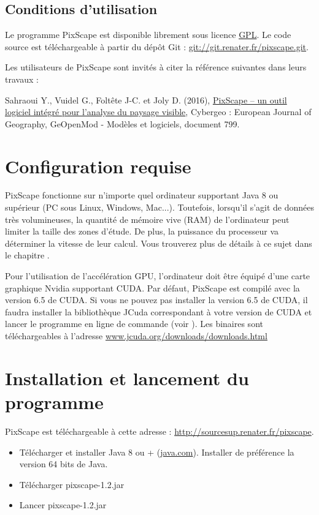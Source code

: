 \documentclass{report}
\begin{document}
\subsection{Conditions d’utilisation}
Le programme PixScape est disponible librement sous licence \href{https://www.gnu.org/licenses/gpl-3.0.fr.html}{GPL}. Le code source est téléchargeable à partir du dépôt Git : \url{git://git.renater.fr/pixscape.git}.

Les utilisateurs de PixScape sont invités à citer la référence  suivantes  dans leurs travaux :

Sahraoui Y., Vuidel G., Foltête J-C. et Joly D. (2016), \href{http://cybergeo.revues.org/27862}{PixScape – un outil logiciel intégré pour l’analyse du paysage visible}, Cybergeo : European Journal of Geography, GeOpenMod - Modèles et logiciels, document 799. 


\section{Configuration requise}

PixScape fonctionne sur n'importe quel ordinateur supportant Java 8 ou supérieur (PC sous Linux, Windows, Mac...). Toutefois, lorsqu'il s'agit de données très volumineuses, la quantité de mémoire vive (RAM) de l’ordinateur peut limiter la taille des zones d'étude. De plus, la puissance du processeur va déterminer la vitesse de leur calcul. Vous trouverez plus de détails à ce sujet dans le chapitre . 

Pour l'utilisation de l'accélération GPU, l'ordinateur doit être équipé d'une carte graphique Nvidia supportant CUDA. Par défaut, PixScape est compilé avec la version 6.5 de CUDA. Si vous ne pouvez pas installer la version 6.5 de CUDA, il faudra installer la bibliothèque JCuda correspondant à votre version de CUDA et lancer le programme en ligne de commande (voir ). Les binaires sont téléchargeables à l'adresse \href{http://www.jcuda.org/downloads/downloads.html}{www.jcuda.org/downloads/downloads.html}

\section{Installation et lancement du programme}

PixScape est téléchargeable à cette adresse : \url{http://sourcesup.renater.fr/pixscape}.

\begin{itemize}
	\item Télécharger et installer Java 8 ou + (\href{http://www.java.com}{java.com}). Installer de préférence la version 64 bits de Java.
	\item Télécharger pixscape-1.2.jar
	\item Lancer pixscape-1.2.jar
\end{itemize}
\end{document}
